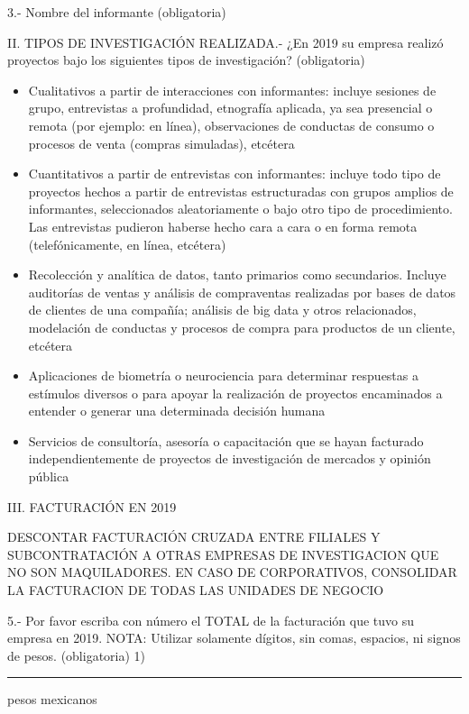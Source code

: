 3.- Nombre del informante (obligatoria)\newline

II. TIPOS DE INVESTIGACIÓN REALIZADA.- ¿En 2019 su empresa realizó proyectos bajo los siguientes tipos de investigación? (obligatoria)

\begin{itemize}
    \item[A)] Cualitativos a partir de interacciones con informantes: incluye sesiones de grupo, entrevistas a profundidad, etnografía aplicada, ya sea presencial o remota (por ejemplo: en línea), observaciones de conductas de consumo o procesos de venta (compras simuladas), etcétera
    \item[B)] Cuantitativos a partir de entrevistas con informantes: incluye todo tipo de proyectos hechos a partir de entrevistas estructuradas con grupos amplios de informantes, seleccionados aleatoriamente o bajo otro tipo de procedimiento. Las entrevistas pudieron haberse hecho cara a cara o en forma remota (telefónicamente, en línea, etcétera)
    \item[C)] Recolección y analítica de datos, tanto primarios como secundarios. Incluye auditorías de ventas y análisis de compraventas realizadas por bases de datos de clientes de una compañía; análisis de big data y otros relacionados, modelación de conductas y procesos de compra para productos de un cliente, etcétera
    \item[D)] Aplicaciones de biometría o neurociencia para determinar respuestas a estímulos diversos o para apoyar la realización de proyectos encaminados a entender o generar una determinada decisión humana
    \item[E)] Servicios de consultoría, asesoría o capacitación que se hayan facturado independientemente de proyectos de investigación de mercados y opinión pública
\end{itemize}

III. FACTURACIÓN EN 2019\newline

DESCONTAR FACTURACIÓN CRUZADA ENTRE FILIALES Y SUBCONTRATACIÓN A OTRAS EMPRESAS DE INVESTIGACION QUE NO SON MAQUILADORES. EN CASO DE CORPORATIVOS, CONSOLIDAR LA FACTURACION DE TODAS LAS UNIDADES DE NEGOCIO

5.- Por favor escriba con número el TOTAL de la facturación que tuvo su empresa en 2019. NOTA: Utilizar solamente dígitos, sin comas, espacios, ni signos de pesos. (obligatoria)
1) \rule{20mm}{0.1mm} pesos mexicanos

